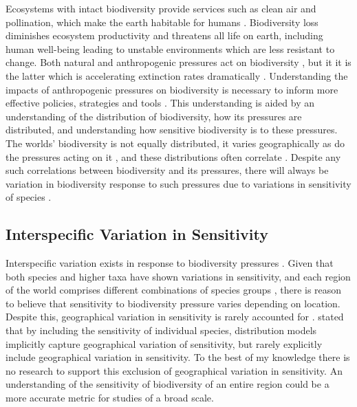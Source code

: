 \documentclass[11pt, a4paper, titlepage]{article}
\begin{document}
	Ecosystems with intact biodiversity provide services such as clean air and pollination, which make the earth habitable for humans \citep{leemans2003millennium}. Biodiversity loss diminishes ecosystem productivity \citep{duffy2017biodiversity} and threatens all life on earth, including human well-being \citep{diaz2006biodiversity} leading to unstable environments which are less resistant to change. Both natural and anthropogenic pressures act on biodiversity \citep{nobel2020anthropogenic}, but it it is the latter which is accelerating extinction rates dramatically \citep{ceballos2015accelerated}. Understanding the impacts of anthropogenic pressures on biodiversity is necessary to inform more effective policies, strategies and tools \citep{diaz2006biodiversity, hansen2001global}. This understanding is aided by an understanding of the  distribution of biodiversity, how its pressures are distributed, and understanding how sensitive biodiversity is to these pressures. The worlds' biodiversity is not equally distributed, it varies geographically \citep{gaston2000global, ricklefs2004comprehensive, mcrae2017diversity}  as do the pressures acting on it \citep{millennium2005ecosystems, sala2000global, bowler2020mapping}, and these distributions often correlate \citep{ament2019compatibility, Velde2022}. Despite any such correlations between biodiversity and its pressures, there will always be variation in biodiversity response to such pressures due to variations in sensitivity of species \citep{bowler2020mapping}. 
	
   	\subsection*{Interspecific Variation in Sensitivity}
   	 Interspecific variation exists in response to biodiversity pressures \citep{foden2013identifying}. Given that both species and higher taxa \citep{sunday2015species} have shown variations in sensitivity, and each region of the world comprises different combinations of species groups \citep{goethem2021biodiversity}, there is reason to believe that sensitivity to biodiversity pressure varies depending on location. Despite this, geographical variation in sensitivity is rarely accounted for \citep{newbold2020tropical, sala2000global}. \citet{newbold2020tropical} stated that by including the sensitivity of individual species, distribution models implicitly capture geographical variation of sensitivity, but rarely explicitly include geographical variation in sensitivity. To the best of my knowledge there is no research to support this exclusion of geographical variation in sensitivity. An understanding of the sensitivity of biodiversity of an entire region could be a more accurate metric for studies of a broad scale. \newline
\end{document}
